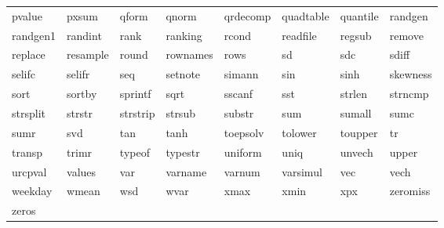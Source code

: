\begin{tabular}{llllllll}
pvalue & pxsum & qform & qnorm & qrdecomp & quadtable & quantile & randgen \\
randgen1 & randint & rank & ranking & rcond & readfile & regsub & remove \\
replace & resample & round & rownames & rows & sd & sdc & sdiff \\
selifc & selifr & seq & setnote & simann & sin & sinh & skewness \\
sort & sortby & sprintf & sqrt & sscanf & sst & strlen & strncmp \\
strsplit & strstr & strstrip & strsub & substr & sum & sumall & sumc \\
sumr & svd & tan & tanh & toepsolv & tolower & toupper & tr \\
transp & trimr & typeof & typestr & uniform & uniq & unvech & upper \\
urcpval & values & var & varname & varnum & varsimul & vec & vech \\
weekday & wmean & wsd & wvar & xmax & xmin & xpx & zeromiss \\
zeros & \\
\end{tabular}

